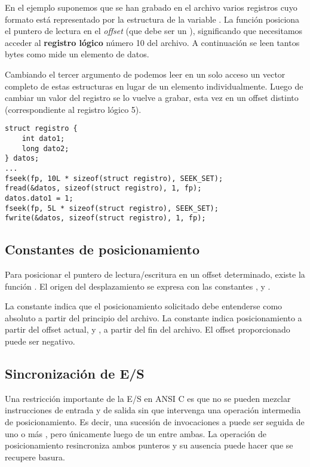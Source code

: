 \begin{ejemplo}
En el ejemplo suponemos que se han grabado en el archivo varios registros cuyo
formato está representado por la estructura de la variable . La función
 posiciona el puntero de lectura en el \textit{offset}  (que debe
ser un ), significando que necesitamos acceder al \textbf{registro lógico} número 10 del
archivo. A continuación se leen tantos bytes como mide un elemento de datos.

Cambiando el tercer argumento de  podemos leer en un solo acceso un
vector completo de estas estructuras en lugar de un elemento individualmente.
Luego de cambiar un valor del registro se lo vuelve a grabar, esta vez en un
offset distinto (correspondiente al registro lógico 5).
\begin{lstlisting}
struct registro {
    int dato1;
    long dato2;
} datos;
...
fseek(fp, 10L * sizeof(struct registro), SEEK_SET);
fread(&datos, sizeof(struct registro), 1, fp);
datos.dato1 = 1;
fseek(fp, 5L * sizeof(struct registro), SEEK_SET);
fwrite(&datos, sizeof(struct registro), 1, fp);
\end{lstlisting}
\end{ejemplo}

\subsection{Constantes de posicionamiento}
\label{subsubsec:posicionamiento}
Para posicionar el puntero de lectura/escritura en un offset determinado,
existe la función . El origen del desplazamiento se expresa 
con las constantes ,  y .

La constante  indica que el posicionamiento solicitado debe entenderse
como absoluto a partir del principio del archivo. La constante 
indica posicionamiento a partir del offset actual, y , a partir del fin del
archivo. El offset proporcionado puede ser negativo.

\subsection{Sincronización de E/S}
Una restricción importante de la E/S en ANSI C es que no se pueden mezclar
instrucciones de entrada y de salida sin que intervenga una operación
intermedia de posicionamiento. Es decir, una sucesión de invocaciones a  
puede ser seguida de uno o más , pero únicamente luego de un 
entre ambas. La operación de posicionamiento resincroniza ambos punteros y su
ausencia puede hacer que se recupere basura.

